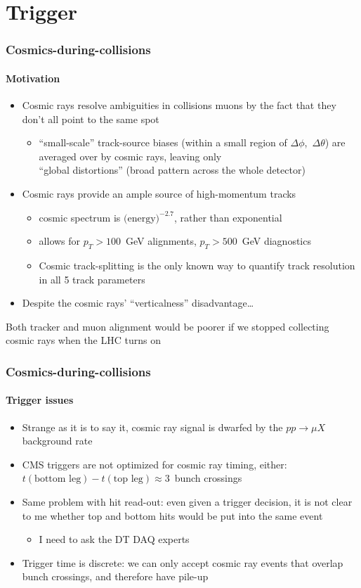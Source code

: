 \documentclass[compress]{beamer}
\begin{document}
\section*{Trigger}

\begin{frame}
\frametitle{Cosmics-during-collisions}
\framesubtitle{Motivation}

\begin{itemize}\setlength{\itemsep}{0.25 cm}
\item Cosmic rays resolve ambiguities in collisions muons by the fact
  that they don't all point to the same spot
\begin{itemize}
\item ``small-scale'' track-source biases (within a small region of
  $\Delta \phi$,~$\Delta \theta$) are averaged over by cosmic rays,
  leaving only \\ ``global distortions'' (broad pattern across the
  whole detector)
\end{itemize}
\item Cosmic rays provide an ample source of high-momentum tracks
\begin{itemize}\setlength{\itemsep}{0.1 cm}
\item cosmic spectrum is $\mbox{(energy)}^{-2.7}$, rather than exponential
\item allows for $p_T > 100$~GeV alignments, $p_T > 500$~GeV
  diagnostics
\item Cosmic track-splitting is the only known way to quantify
  track resolution in all 5 track parameters
\end{itemize}
\item Despite the cosmic rays' ``verticalness'' disadvantage\ldots
\end{itemize}

\vfill Both tracker and muon alignment would be poorer if we stopped
collecting cosmic rays when the LHC turns on
\end{frame}

\begin{frame}
\frametitle{Cosmics-during-collisions}
\framesubtitle{Trigger issues}

\begin{itemize}\setlength{\itemsep}{0.35 cm}
\item Strange as it is to say it, cosmic ray signal is dwarfed by the
  $pp \to \mu X$ background rate
\item CMS triggers are not optimized for cosmic ray timing, either:
  $t(\mbox{bottom leg}) - t(\mbox{top leg}) \approx 3$~bunch crossings
\item Same problem with hit read-out: even given a trigger decision,
  it is not clear to me whether top and bottom hits would be put into
  the same event
\begin{itemize}
\item I need to ask the DT DAQ experts
\end{itemize}
\item Trigger time is discrete: we can only accept cosmic ray events
  that overlap bunch crossings, and therefore have pile-up
\end{itemize}
\end{frame}
\end{document}
